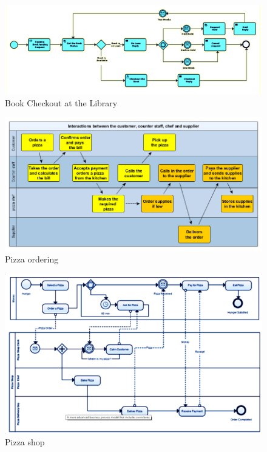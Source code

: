 \documentclass[]{book}
\begin{document}
\begin{figure}
\centering
\includegraphics{images/bookckout.png}
\caption{Book Checkout at the Library}
\end{figure}

\begin{figure}
\centering
\includegraphics{images/pizza.png}
\caption{Pizza ordering}
\end{figure}

\begin{figure}
\centering
\includegraphics{images/pizza2.png}
\caption{Pizza shop}
\end{figure}
\end{document}
